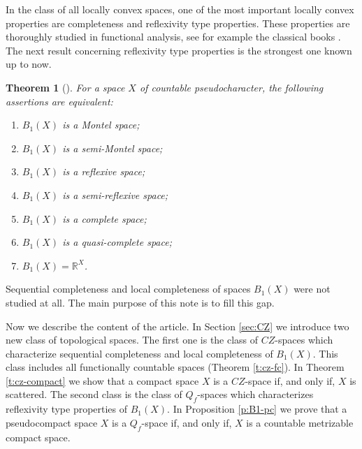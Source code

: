 \documentclass[preprint,11pt]{elsarticle}
\newtheorem{theorem}{Theorem}[section]
\numberwithin{equation}{section}
\numberwithin{theorem}{section}
\newcommand{\IR}{\mathbb{R}}
\begin{document}
In the class of all locally convex spaces, one of the most important locally convex properties are completeness and reflexivity type properties. These properties are thoroughly studied in functional analysis, see for example the classical books \cite{Jar,PB}.  The next result concerning reflexivity type properties is the strongest one known up to now.


\begin{theorem}[] \label{t:B1-Baire-complete}
For a space $X$ of countable pseudocharacter, the following assertions are equivalent:
\begin{enumerate}
\item[{\rm (a)}] $B_1(X)$ is a Montel space;
\item[{\rm (b)}] $B_1(X)$ is a semi-Montel space;
\item[{\rm (c)}] $B_1(X)$ is a reflexive space;
\item[{\rm (d)}] $B_1(X)$ is a semi-reflexive space;
\item[{\rm (e)}] $B_1(X)$ is a complete space;
\item[{\rm (f)}] $B_1(X)$ is a quasi-complete space;
\item[{\rm (g)}] $B_1(X)=\IR^X$.
\end{enumerate}
\end{theorem}
Sequential completeness and  local completeness of spaces $B_1(X)$ were not studied at all.
The main purpose of this note is to fill this gap.


Now we describe the content of the article.
In Section \ref{sec:CZ} we introduce  two new class of topological spaces. The first one is the class of $CZ$-spaces which characterize sequential completeness  and local completeness of $B_1(X)$. This class includes all functionally countable spaces (Theorem \ref{t:cz-fc}). In Theorem \ref{t:cz-compact} we show that a compact space $X$ is a $CZ$-space if, and only if, $X$ is scattered.
The second class is the class of $Q_f$-spaces which characterizes reflexivity type properties of $B_1(X)$. In Proposition \ref{p:B1-pc} we prove that a pseudocompact space $X$ is a $Q_f$-space if, and only if, $X$ is a countable metrizable compact space.
\end{document}
